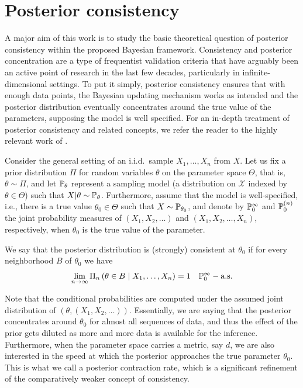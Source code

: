 \section{Posterior consistency}\label{sec:posterior-consistency-intro}

A major aim of this work is to study the basic theoretical question of posterior consistency within the proposed Bayesian framework. Consistency and posterior concentration are a type of frequentist validation criteria that have arguably been an active point of research in the last few decades, particularly in infinite-dimensional settings. To put it simply, posterior consistency ensures that with enough data points, the Bayesian updating mechanism works as intended and the posterior distribution eventually concentrates around the true value of the parameters, supposing the model is well specified. For an in-depth treatment of posterior consistency and related concepts, we refer the reader to the highly relevant work of \citet{ghosal2017fundamentals}.

Consider the general setting of an i.i.d.\ sample \(X_1,\dots, X_n\) from \(X\). Let us fix a prior distribution \(\Pi\) for random variables \(\theta\) on the parameter space \(\Theta\), that is, \(\theta \sim \Pi\), and let \(\mathbb{P}_\theta\) represent a sampling model (a distribution on \(\mathcal X\) indexed by \(\theta \in \Theta\)) such that \(X | \theta \sim \mathbb{P}_{\theta}\). Furthermore, assume that the model is well-specified, i.e., there is a true value \(\theta_{0}\in\Theta\) such that \(X \sim \mathbb{P}_{\theta_0}\), and denote by \(\mathbb{P}_0^\infty\) and \(\mathbb{P}_0^{(n)}\) the joint probability measures of \((X_1, X_2, \dots)\) and \((X_1, X_2, \dots, X_n)\), respectively, when \(\theta_0\) is the true value of the parameter.

\begin{definition} We say that the posterior distribution is (strongly) consistent at \(\theta_0\) if for every neighborhood \(B\) of \(\theta_0\) we have
  \[
    \lim_{n\to\infty} \Pi_n\left(\theta \in B \mid X_1, \dots, X_n\right) = 1 \quad \mathbb{P}_0^\infty-\text{a.s.}
  \]
\end{definition}

Note that the conditional probabilities are computed under the assumed joint distribution of \((\theta, (X_1, X_2,\dots))\). Essentially, we are saying that the posterior concentrates around \(\theta_0\) for almost all sequences of data, and thus the effect of the prior gets diluted as more and more data is available for the inference. Furthermore, when the parameter space carries a metric, say \(d\), we are also interested in the speed at which the posterior approaches the true parameter \(\theta_0\). This is what we call a posterior contraction rate, which is a significant refinement of the comparatively weaker concept of consistency.

